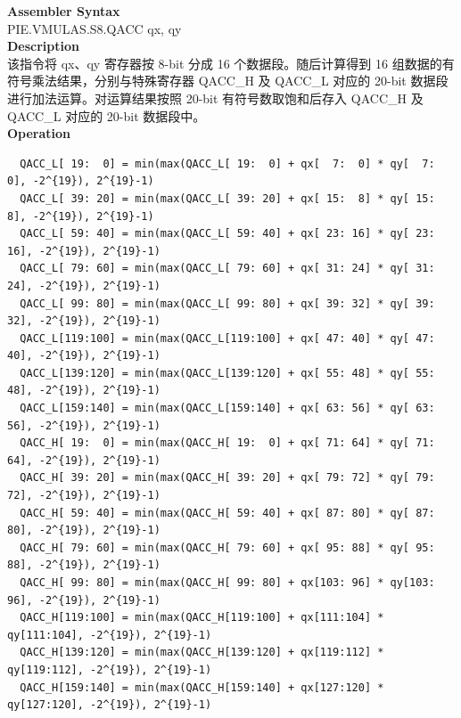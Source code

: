 \textbf{Assembler Syntax} \\
PIE.VMULAS.S8.QACC qx, qy \\
\textbf{Description} \\
该指令将 qx、qy 寄存器按 8-bit 分成 16 个数据段。随后计算得到 16 组数据的有符号乘法结果，分别与特殊寄存器 QACC\_H 及 QACC\_L 对应的 20-bit 数据段进行加法运算。对运算结果按照 20-bit 有符号数取饱和后存入 QACC\_H 及 QACC\_L 对应的 20-bit 数据段中。\\
\textbf{Operation}
\begin{lstlisting}
  QACC_L[ 19:  0] = min(max(QACC_L[ 19:  0] + qx[  7:  0] * qy[  7:  0], -2^{19}), 2^{19}-1)
  QACC_L[ 39: 20] = min(max(QACC_L[ 39: 20] + qx[ 15:  8] * qy[ 15:  8], -2^{19}), 2^{19}-1)
  QACC_L[ 59: 40] = min(max(QACC_L[ 59: 40] + qx[ 23: 16] * qy[ 23: 16], -2^{19}), 2^{19}-1)
  QACC_L[ 79: 60] = min(max(QACC_L[ 79: 60] + qx[ 31: 24] * qy[ 31: 24], -2^{19}), 2^{19}-1)
  QACC_L[ 99: 80] = min(max(QACC_L[ 99: 80] + qx[ 39: 32] * qy[ 39: 32], -2^{19}), 2^{19}-1)
  QACC_L[119:100] = min(max(QACC_L[119:100] + qx[ 47: 40] * qy[ 47: 40], -2^{19}), 2^{19}-1)
  QACC_L[139:120] = min(max(QACC_L[139:120] + qx[ 55: 48] * qy[ 55: 48], -2^{19}), 2^{19}-1)
  QACC_L[159:140] = min(max(QACC_L[159:140] + qx[ 63: 56] * qy[ 63: 56], -2^{19}), 2^{19}-1)
  QACC_H[ 19:  0] = min(max(QACC_H[ 19:  0] + qx[ 71: 64] * qy[ 71: 64], -2^{19}), 2^{19}-1)
  QACC_H[ 39: 20] = min(max(QACC_H[ 39: 20] + qx[ 79: 72] * qy[ 79: 72], -2^{19}), 2^{19}-1)
  QACC_H[ 59: 40] = min(max(QACC_H[ 59: 40] + qx[ 87: 80] * qy[ 87: 80], -2^{19}), 2^{19}-1)
  QACC_H[ 79: 60] = min(max(QACC_H[ 79: 60] + qx[ 95: 88] * qy[ 95: 88], -2^{19}), 2^{19}-1)
  QACC_H[ 99: 80] = min(max(QACC_H[ 99: 80] + qx[103: 96] * qy[103: 96], -2^{19}), 2^{19}-1)
  QACC_H[119:100] = min(max(QACC_H[119:100] + qx[111:104] * qy[111:104], -2^{19}), 2^{19}-1)
  QACC_H[139:120] = min(max(QACC_H[139:120] + qx[119:112] * qy[119:112], -2^{19}), 2^{19}-1)
  QACC_H[159:140] = min(max(QACC_H[159:140] + qx[127:120] * qy[127:120], -2^{19}), 2^{19}-1)
\end{lstlisting}

\newpage
